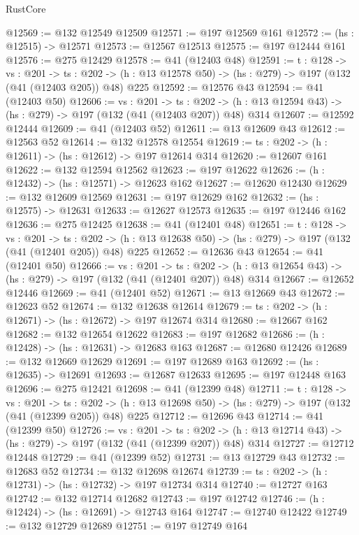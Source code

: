 \begin{lexlean}{RustCore}
\begin{coremodule}
@12569 := @132 @12549 @12509
@12571 := @197 @12569 @161
@12572 := (hs : @12515) -> @12571
@12573 := @12567 @12513
@12575 := @197 @12444 @161
@12576 := @275 @12429
@12578 := @41 (@12403 @48)
@12591 := {t : @128} ->
  {vs : @201} ->
  {ts : @202} -> (h : @13 @12578 @50) -> (hs : @279) -> @197 (@132 (@41 (@12403 @205)) @48) @225
@12592 := @12576 @43
@12594 := @41 (@12403 @50)
@12606 := {vs : @201} ->
  {ts : @202} -> (h : @13 @12594 @43) -> (hs : @279) -> @197 (@132 (@41 (@12403 @207)) @48) @314
@12607 := @12592 @12444
@12609 := @41 (@12403 @52)
@12611 := @13 @12609 @43
@12612 := @12563 @52
@12614 := @132 @12578 @12554
@12619 := {ts : @202} -> (h : @12611) -> (hs : @12612) -> @197 @12614 @314
@12620 := @12607 @161
@12622 := @132 @12594 @12562
@12623 := @197 @12622
@12626 := (h : @12432) -> (hs : @12571) -> @12623 @162
@12627 := @12620 @12430
@12629 := @132 @12609 @12569
@12631 := @197 @12629 @162
@12632 := (hs : @12575) -> @12631
@12633 := @12627 @12573
@12635 := @197 @12446 @162
@12636 := @275 @12425
@12638 := @41 (@12401 @48)
@12651 := {t : @128} ->
  {vs : @201} ->
  {ts : @202} -> (h : @13 @12638 @50) -> (hs : @279) -> @197 (@132 (@41 (@12401 @205)) @48) @225
@12652 := @12636 @43
@12654 := @41 (@12401 @50)
@12666 := {vs : @201} ->
  {ts : @202} -> (h : @13 @12654 @43) -> (hs : @279) -> @197 (@132 (@41 (@12401 @207)) @48) @314
@12667 := @12652 @12446
@12669 := @41 (@12401 @52)
@12671 := @13 @12669 @43
@12672 := @12623 @52
@12674 := @132 @12638 @12614
@12679 := {ts : @202} -> (h : @12671) -> (hs : @12672) -> @197 @12674 @314
@12680 := @12667 @162
@12682 := @132 @12654 @12622
@12683 := @197 @12682
@12686 := (h : @12428) -> (hs : @12631) -> @12683 @163
@12687 := @12680 @12426
@12689 := @132 @12669 @12629
@12691 := @197 @12689 @163
@12692 := (hs : @12635) -> @12691
@12693 := @12687 @12633
@12695 := @197 @12448 @163
@12696 := @275 @12421
@12698 := @41 (@12399 @48)
@12711 := {t : @128} ->
  {vs : @201} ->
  {ts : @202} -> (h : @13 @12698 @50) -> (hs : @279) -> @197 (@132 (@41 (@12399 @205)) @48) @225
@12712 := @12696 @43
@12714 := @41 (@12399 @50)
@12726 := {vs : @201} ->
  {ts : @202} -> (h : @13 @12714 @43) -> (hs : @279) -> @197 (@132 (@41 (@12399 @207)) @48) @314
@12727 := @12712 @12448
@12729 := @41 (@12399 @52)
@12731 := @13 @12729 @43
@12732 := @12683 @52
@12734 := @132 @12698 @12674
@12739 := {ts : @202} -> (h : @12731) -> (hs : @12732) -> @197 @12734 @314
@12740 := @12727 @163
@12742 := @132 @12714 @12682
@12743 := @197 @12742
@12746 := (h : @12424) -> (hs : @12691) -> @12743 @164
@12747 := @12740 @12422
@12749 := @132 @12729 @12689
@12751 := @197 @12749 @164

\end{coremodule}
\end{lexlean}
